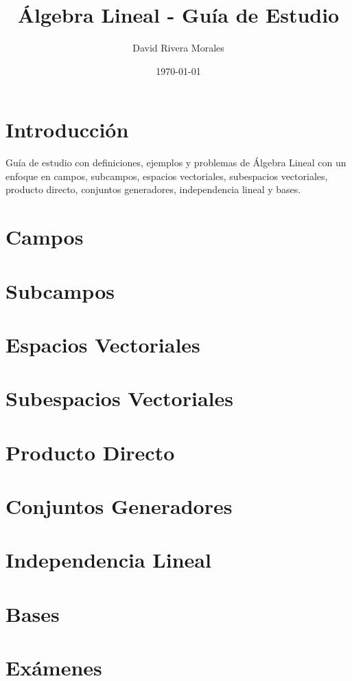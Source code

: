 \documentclass{article}
\title{Álgebra Lineal - Guía de Estudio}
\author{David Rivera Morales}
\date{\today}
\begin{document}
\maketitle

\section{Introducción}

Guía de estudio con definiciones, ejemplos y problemas de Álgebra Lineal con un enfoque en campos, subcampos, espacios vectoriales, subespacios vectoriales, producto directo, conjuntos generadores, independencia lineal y bases.

\section{Campos}



\section{Subcampos}



\section{Espacios Vectoriales}



\section{Subespacios Vectoriales}



\section{Producto Directo}



\section{Conjuntos Generadores}



\section{Independencia Lineal}



\section{Bases}




\section{Exámenes}


\end{document}
